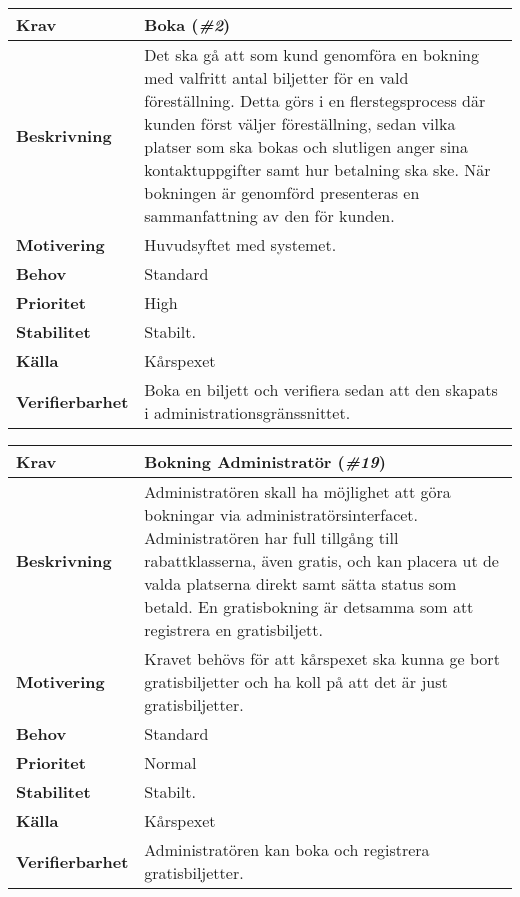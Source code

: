 \documentclass[a4paper, twoside, 11pt, titlepage]{article}
\begin{document}
		\begin{tabular} { p{2.6cm} p{12.5cm} }
			\hline
			\sffamily\textbf{Krav} & Boka (\emph{\#2})  \\
			\hline
			\sffamily\textbf{Beskrivning} & Det ska gå att som kund genomföra en bokning med valfritt antal biljetter för en vald föreställning. Detta görs i en flerstegsprocess där kunden först väljer föreställning, sedan vilka platser som ska bokas och slutligen anger sina kontaktuppgifter samt hur betalning ska ske. När bokningen är genomförd presenteras en sammanfattning av den för kunden.  \\
			\hline
			\sffamily\textbf{Motivering} & Huvudsyftet med systemet.  \\
			\hline
			\sffamily\textbf{Behov} & Standard  \\
			\hline
			\sffamily\textbf{Prioritet} & High  \\
			\hline
			\sffamily\textbf{Stabilitet} & Stabilt.  \\
			\hline
			\sffamily\textbf{Källa} & Kårspexet  \\
			\hline
			\sffamily\textbf{Verifierbarhet} & Boka en biljett och verifiera sedan att den skapats i administrationsgränssnittet.  \\
			\hline
		\end{tabular}
		\vspace{6mm}

		\begin{tabular} { p{2.6cm} p{12.5cm} }
			\hline
			\sffamily\textbf{Krav} & Bokning Administratör (\emph{\#19})  \\
			\hline
			\sffamily\textbf{Beskrivning} & Administratören skall ha möjlighet att göra bokningar via administratörsinterfacet. Administratören har full tillgång till rabattklasserna, även gratis, och kan placera ut de valda platserna direkt samt sätta status som betald. En gratisbokning är detsamma som att registrera en gratisbiljett.  \\
			\hline
			\sffamily\textbf{Motivering} & Kravet behövs för att kårspexet ska kunna ge bort gratisbiljetter och ha koll på att det är just gratisbiljetter.  \\
			\hline
			\sffamily\textbf{Behov} & Standard  \\
			\hline
			\sffamily\textbf{Prioritet} & Normal  \\
			\hline
			\sffamily\textbf{Stabilitet} & Stabilt.  \\
			\hline
			\sffamily\textbf{Källa} & Kårspexet  \\
			\hline
			\sffamily\textbf{Verifierbarhet} & Administratören kan boka och registrera gratisbiljetter.  \\
			\hline
		\end{tabular}
		\vspace{6mm}
\end{document}
